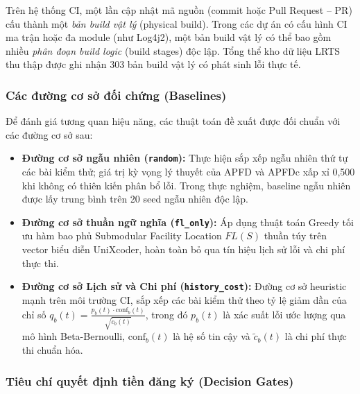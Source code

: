 Trên hệ thống CI, một lần cập nhật mã nguồn (commit hoặc Pull Request -- PR) cấu thành một \textit{bản build vật lý} (physical build). Trong các dự án có cấu hình CI ma trận hoặc đa module (như Log4j2), một bản build vật lý có thể bao gồm nhiều \textit{phân đoạn build logic} (build stages) độc lập.
Tổng thể kho dữ liệu LRTS thu thập được ghi nhận 303 bản build vật lý có phát sinh lỗi thực tế.

\subsubsection{Các đường cơ sở đối chứng (Baselines)}
\label{subsubsec:baselines}

Để đánh giá tương quan hiệu năng, các thuật toán đề xuất được đối chuẩn với các đường cơ sở sau:
\begin{itemize}
    \item \textbf{Đường cơ sở ngẫu nhiên (\texttt{random}):} Thực hiện sắp xếp ngẫu nhiên thứ tự các bài kiểm thử; giá trị kỳ vọng lý thuyết của APFD và APFDc xấp xỉ 0,500 khi không có thiên kiến phân bổ lỗi. Trong thực nghiệm, baseline ngẫu nhiên được lấy trung bình trên 20 seed ngẫu nhiên độc lập.
    \item \textbf{Đường cơ sở thuần ngữ nghĩa (\texttt{fl\_only}):} Áp dụng thuật toán Greedy tối ưu hàm bao phủ Submodular Facility Location $FL(S)$ thuần túy trên vector biểu diễn UniXcoder, hoàn toàn bỏ qua tín hiệu lịch sử lỗi và chi phí thực thi.
    \item \textbf{Đường cơ sở Lịch sử và Chi phí (\texttt{history\_cost}):} Đường cơ sở heuristic mạnh trên môi trường CI, sắp xếp các bài kiểm thử theo tỷ lệ giảm dần của chỉ số $q_b(t) = \frac{p_b(t) \cdot \text{conf}_b(t)}{\sqrt{\tilde{c}_b(t)}}$, trong đó $p_b(t)$ là xác suất lỗi ước lượng qua mô hình Beta-Bernoulli, $\text{conf}_b(t)$ là hệ số tin cậy và $\tilde{c}_b(t)$ là chi phí thực thi chuẩn hóa.
\end{itemize}

\subsubsection{Tiêu chí quyết định tiền đăng ký (Decision Gates)}
\label{subsubsec:decision_gates}

